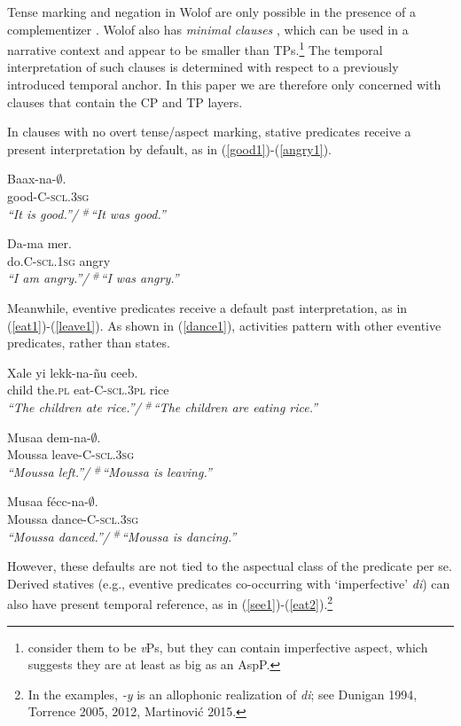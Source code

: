 \documentclass[output=paper
,modfonts
,nonflat]{langsci/langscibook}
\begin{document}
 Tense marking and negation in Wolof are only
possible in the presence of a complementizer \citep{Njie1982}. Wolof
also has \textit{minimal clauses} \citep{Sauvageot1965,
  church81systeme,  Dialo1981, robert91approche,
  Zribi-HertzDiagne2003}, which can be used in a narrative context and
appear to be smaller than TPs.\footnote{\cite{Zribi-HertzDiagne2003} consider
them to be \textit{v}Ps, but they can contain imperfective aspect,
which suggests they are at least as big as an AspP.} The temporal interpretation of such
clauses is determined with respect to a previously introduced
temporal anchor. In this paper we
are therefore only concerned with clauses that contain the CP and TP layers.

In clauses with no overt tense/aspect marking, stative predicates receive a present interpretation by default, as in (\ref{good1})-(\ref{angry1}).

\ea
\gll Baax-na-$\emptyset$.\\
good-C-\textsc{scl.3sg}\\
\glt \textit{``It is good.''/ $^{\#}$``It was good.''}\label{good1}
\z

\ea
\gll Da-ma mer.\\
do.C-\textsc{scl.1sg} angry\\
\glt \textit{``I am angry.''/ $^{\#}$``I was angry.''}\label{angry1}
\z

Meanwhile, eventive predicates receive a default past interpretation, as in (\ref{eat1})-(\ref{leave1}). As shown in (\ref{dance1}), activities pattern with other eventive predicates, rather than states.

\ea
\gll Xale yi lekk-na-\~nu ceeb.\\
child the.\textsc{pl} eat-C-\textsc{scl.3pl} rice\\
\glt \textit{``The children ate rice.''/ $^{\#}$``The children are eating
  rice.''}\label{eat1}
\z
 
\ea
\gll Musaa dem-na-$\emptyset$.\\
Moussa leave-C-\textsc{scl.3sg}\\
\glt \textit{``Moussa left.''/ $^{\#}$``Moussa is leaving.''}\label{leave1}
\z

\ea
\gll Musaa f\'ecc-na-$\emptyset$.\\
Moussa dance-C-\textsc{scl.3sg}\\
\glt \textit{``Moussa danced.''/ $^{\#}$``Moussa is dancing.''}\label{dance1}
\z

However, these defaults are not tied to the aspectual class of the predicate
per se. Derived statives (e.g., eventive predicates co-occurring with
`imperfective'  \textit{di}) can also have present temporal reference,
as in (\ref{see1})-(\ref{eat2}).\footnote{In the examples, \textit{-y} is
an allophonic realization of \textit{di}; see Dunigan 1994, Torrence
2005, 2012, Martinovi\'c 2015.}
\end{document}
